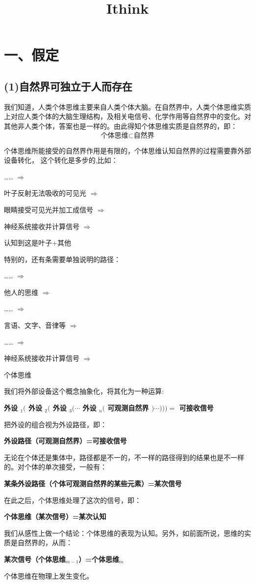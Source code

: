 \documentclass[fontset=windows, 12pt, a4paper]{article}
\date{}
\title{Ithink}
\begin{document}
\maketitle

\section*{一、假定}
\subsection*{(1)自然界可独立于人而存在}

我们知道，人类个体思维主要来自人类个体大脑。在自然界中，人类个体思维实质上对应人类个体的大脑生理结构，及相关电信号、化学作用等自然界中的变化。对其他非人类个体，答案也是一样的。由此得知个体思维实质是自然界的，即：
$$\pmb{\mbox{个体思维} \subset \mbox{自然界}}$$

个体思维所能接受的自然界作用是有限的，个体思维认知自然界的过程需要靠外部设备转化，
这个转化是多步的,比如：\par
\begin{center}
    ……
    $\Rightarrow$\par
    叶子反射无法吸收的可见光
    $\Rightarrow$\par
    眼睛接受可见光并加工成信号
    $\Rightarrow$\par
    神经系统接收并计算信号
    $\Rightarrow$\par
    认知到这是叶子+其他
\end{center}
特别的，还有条需要单独说明的路径：\par
\begin{center}
    ……
    $\Rightarrow$\par
    他人的思维
    $\Rightarrow$\par
    ……
    $\Rightarrow$\par
    言语、文字、音律等
    $\Rightarrow$\par
    ……
    $\Rightarrow$\par
    神经系统接收并计算信号
    $\Rightarrow$\par
    个体思维
\end{center}

我们将外部设备这个概念抽象化，将其化为一种运算:\par
\centerline{\textbf{
    外设 $_1($ 外设 $_2($ 外设 $_3(\cdots$
    外设 $_n($ 可观测自然界 $)\cdots)))=$
    可接收信号
}}
把外设的组合视为外设路径，即：\par
\centerline{\textbf{
    外设路径（可观测自然界）=可接收信号
}}
无论在个体还是集体中，路径都是不一的，不一样的路径得到的结果也是不一样的。对个体的单次接受，一般有：\par
\centerline{\textbf{
    某条外设路径（个体可观测自然界的某些元素）=某次信号
}}
在此之后，个体思维处理了这次的信号，即：\par
\centerline{\textbf{
    个体思维（某次信号）=某次认知
}}
我们从感性上做一个结论：个体思维的表现为认知。另外，如前面所说，思维的实质是自然界的，从而：\par
\centerline{\textbf{
    某次信号（个体思维$_{m-1}$）=个体思维$_m$
}}
个体思维在物理上发生变化。
\end{document}
